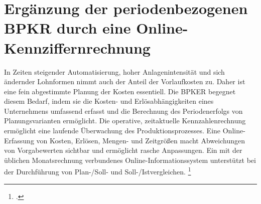 \section{Ergänzung der periodenbezogenen BPKR durch eine Online-Kennziffernrechnung}

In Zeiten steigender Automatisierung, hoher Anlagenintensität und sich ändernder Lohnformen nimmt auch der Anteil der Vorlaufkosten zu. Daher ist eine fein abgestimmte Planung der Kosten essentiell. Die BPKER begegnet diesem Bedarf, indem sie die Kosten- und Erlösabhängigkeiten eines Unternehmens umfassend erfasst und die Berechnung des Periodenerfolgs von Planungsvarianten ermöglicht. Die operative, zeitaktuelle Kennzahlenrechnung ermöglicht eine laufende Überwachung des Produktionsprozesses. Eine Online-Erfassung von Kosten, Erlösen, Mengen- und Zeitgrö{\ss}en macht Abweichungen von Vorgabewerten sichtbar und ermöglicht rasche Anpassungen. Ein mit der üblichen Monatsrechnung verbundenes Online-Informationssystem unterstützt bei der Durchführung von Plan-/Soll- und Soll-/Istvergleichen. \footcite[Vgl.][S. 310ff]{Artikel_orginal}
